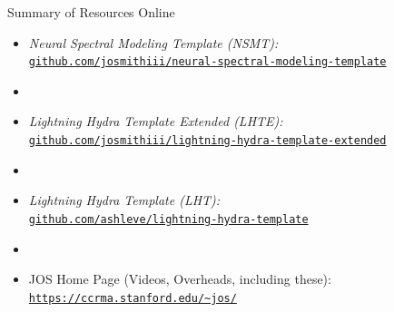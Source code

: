 
\begin{slide}[\slideopts,toc={}]{Summary of Resources Online}
  \begin{itemize}
    \item \emph{Neural Spectral Modeling Template (NSMT):}\\
      \href{https://github.com/josmithiii/neural-spectral-modeling-template.git}
           {\texttt{github.com/josmithiii/neural-spectral-modeling-template}}
    \item[]
    \item \emph{Lightning Hydra Template Extended (LHTE):}\\
      \href{https://github.com/josmithiii/lightning-hydra-template-extended.git}
           {\texttt{github.com/josmithiii/lightning-hydra-template-extended}}
    \item[]
    \item \emph{Lightning Hydra Template (LHT):}\\
      \href{https://github.com/ashleve/lightning-hydra-template}
           {\texttt{github.com/ashleve/lightning-hydra-template}}
    \item[]
    \item JOS Home Page (Videos, Overheads, including these):\\
      \href{https://ccrma.stanford.edu/~jos/Welcome.html}
           {\texttt{https://ccrma.stanford.edu/\~{}jos/}}
  \end{itemize}
\end{slide}
